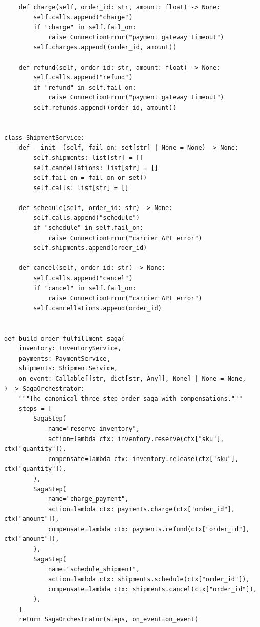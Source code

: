 \begin{verbatim}
    def charge(self, order_id: str, amount: float) -> None:
        self.calls.append("charge")
        if "charge" in self.fail_on:
            raise ConnectionError("payment gateway timeout")
        self.charges.append((order_id, amount))

    def refund(self, order_id: str, amount: float) -> None:
        self.calls.append("refund")
        if "refund" in self.fail_on:
            raise ConnectionError("payment gateway timeout")
        self.refunds.append((order_id, amount))


class ShipmentService:
    def __init__(self, fail_on: set[str] | None = None) -> None:
        self.shipments: list[str] = []
        self.cancellations: list[str] = []
        self.fail_on = fail_on or set()
        self.calls: list[str] = []

    def schedule(self, order_id: str) -> None:
        self.calls.append("schedule")
        if "schedule" in self.fail_on:
            raise ConnectionError("carrier API error")
        self.shipments.append(order_id)

    def cancel(self, order_id: str) -> None:
        self.calls.append("cancel")
        if "cancel" in self.fail_on:
            raise ConnectionError("carrier API error")
        self.cancellations.append(order_id)


def build_order_fulfillment_saga(
    inventory: InventoryService,
    payments: PaymentService,
    shipments: ShipmentService,
    on_event: Callable[[str, dict[str, Any]], None] | None = None,
) -> SagaOrchestrator:
    """The canonical three-step order saga with compensations."""
    steps = [
        SagaStep(
            name="reserve_inventory",
            action=lambda ctx: inventory.reserve(ctx["sku"], ctx["quantity"]),
            compensate=lambda ctx: inventory.release(ctx["sku"], ctx["quantity"]),
        ),
        SagaStep(
            name="charge_payment",
            action=lambda ctx: payments.charge(ctx["order_id"], ctx["amount"]),
            compensate=lambda ctx: payments.refund(ctx["order_id"], ctx["amount"]),
        ),
        SagaStep(
            name="schedule_shipment",
            action=lambda ctx: shipments.schedule(ctx["order_id"]),
            compensate=lambda ctx: shipments.cancel(ctx["order_id"]),
        ),
    ]
    return SagaOrchestrator(steps, on_event=on_event)
\end{verbatim}

